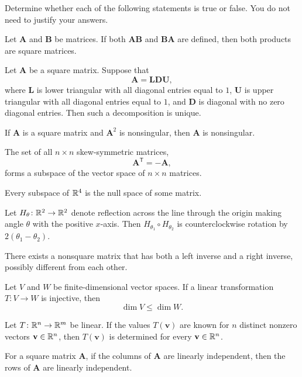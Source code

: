 \documentclass[11pt,oneside]{article}
\begin{document}
\begin{problem}
Determine whether each of the following statements is true or false. You do not need to justify your answers.
\begin{problemchoices}
\item Let $\mathbf A$ and $\mathbf B$ be matrices. If both $\mathbf A\mathbf B$ and $\mathbf B\mathbf A$ are defined, then both products are square matrices.
\item Let $\mathbf A$ be a square matrix. Suppose that
\[
\mathbf A=\mathbf L\mathbf D\mathbf U,
\]
where $\mathbf L$ is lower triangular with all diagonal entries equal to $1$, $\mathbf U$ is upper triangular with all diagonal entries equal to $1$, and $\mathbf D$ is diagonal with no zero diagonal entries. Then such a decomposition is unique.
\item If $\mathbf A$ is a square matrix and $\mathbf A^2$ is nonsingular, then $\mathbf A$ is nonsingular.
\item The set of all $n\times n$ skew-symmetric matrices,
\[
\mathbf A^{\mathsf T}=-\mathbf A,
\]
forms a subspace of the vector space of $n\times n$ matrices.
\item Every subspace of $\mathbb{R}^4$ is the null space of some matrix.
\item Let $H_\theta\colon \mathbb{R}^2\to\mathbb{R}^2$ denote reflection across the line through the origin making angle $\theta$ with the positive $x$-axis. Then $H_{\theta_1}\circ H_{\theta_2}$ is counterclockwise rotation by $2(\theta_1-\theta_2)$.
\item There exists a nonsquare matrix that has both a left inverse and a right inverse, possibly different from each other.
\item Let $V$ and $W$ be finite-dimensional vector spaces. If a linear transformation $T\colon V\to W$ is injective, then
\[
\dim V\le \dim W.
\]
\item Let $T\colon \mathbb{R}^n\to\mathbb{R}^m$ be linear. If the values $T(\mathbf v)$ are known for $n$ distinct nonzero vectors $\mathbf v\in\mathbb{R}^n$, then $T(\mathbf v)$ is determined for every $\mathbf v\in\mathbb{R}^n$.
\item For a square matrix $\mathbf A$, if the columns of $\mathbf A$ are linearly independent, then the rows of $\mathbf A$ are linearly independent.
\end{problemchoices}
\end{problem}
\end{document}

